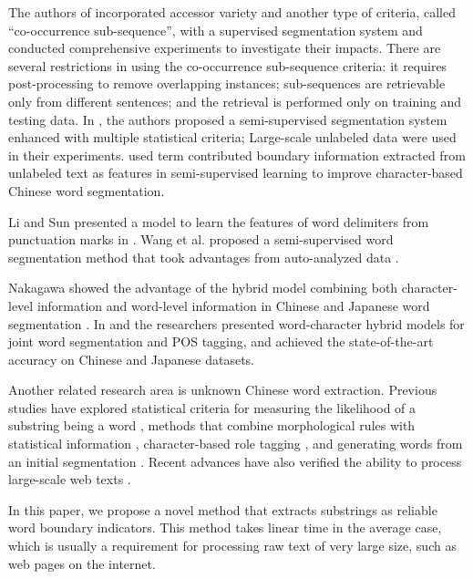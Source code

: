 \documentclass[english]{jnlp_1.4}
\begin{document}
The authors of \cite{zhao2007incorporating} incorporated accessor variety and another type of criteria, called ``co-occurrence sub-sequence'', with a supervised segmentation system and conducted comprehensive experiments to investigate their impacts. There are several restrictions in using the co-occurrence sub-sequence criteria: it requires post-processing to remove overlapping instances; sub-sequences are retrievable only from different sentences; and the retrieval is performed only on training and testing data. In \cite{sun2011enhancing}, the authors proposed a semi-supervised segmentation system enhanced with multiple statistical criteria; Large-scale unlabeled data were used in their experiments.  used term contributed boundary information extracted from unlabeled text as features in semi-supervised learning to improve character-based Chinese word segmentation.

Li and Sun presented a model to learn the features of word delimiters from punctuation marks in \cite{li2009punctuation}. Wang et al. proposed a semi-supervised word segmentation method that took advantages from auto-analyzed data \cite{wang2011improving}.

Nakagawa showed the advantage of the hybrid model combining both character-level information and word-level information in Chinese and Japanese word segmentation \cite{nakagawa2004chinese}. In \cite{nakagawa2007hybrid} and \cite{kruengkrai2009error,kruengkrai2009joint} the researchers presented word-character hybrid models for joint word segmentation and POS tagging, and achieved the state-of-the-art accuracy on Chinese and Japanese datasets.

Another related research area is unknown Chinese word extraction. Previous studies have explored statistical criteria for measuring the likelihood of a substring being a word \cite{feng2004accessor}, methods that combine morphological rules with statistical information \cite{chen2002unknown,ma2003bottom}, character-based role tagging \cite{zhang2002automatic}, and generating words from an initial segmentation \cite{guodong2005chunking,ling2003chinese,goh2005training}. Recent advances have also verified the ability to process large-scale web texts \cite{zhang2011extract}.

In this paper, we propose a novel method that extracts substrings as reliable word boundary indicators. This method takes linear time in the average case, which is usually a requirement for processing raw text of very large size, such as web pages on the internet.
\end{document}
